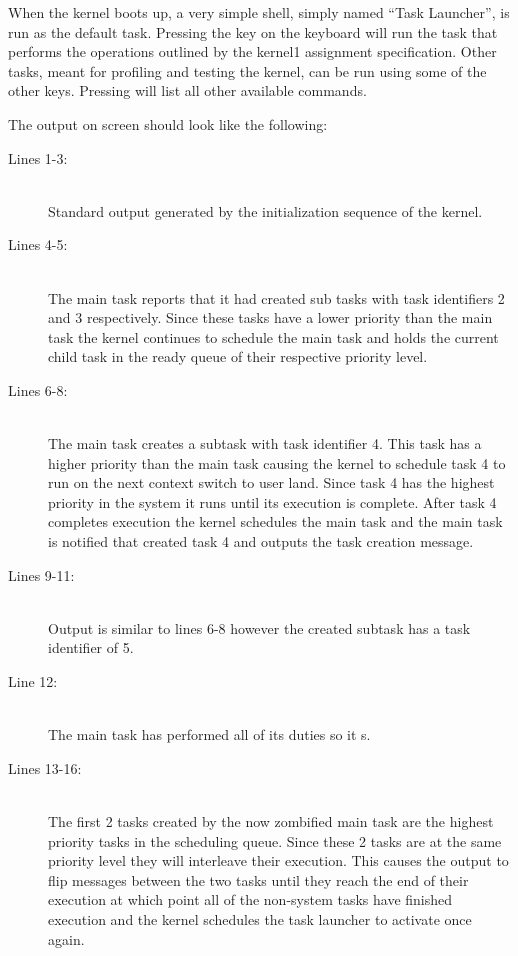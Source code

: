 \documentclass[pdftex,10pt,a4paper]{article}
\begin{document}
When the kernel boots up, a very simple shell, simply named ``Task
Launcher'', is run as the default task. Pressing the  key on
the keyboard will run the task that performs the operations outlined by
the kernel1 assignment specification. Other tasks, meant for
profiling and testing the kernel, can be run using some of the other
keys. Pressing  will list all other available commands.

The output on screen should look like the following:



\begin{description}
\item[Lines 1-3:] \hfill \\
  Standard output generated by the initialization sequence of the kernel.

\item[Lines 4-5:] \hfill \\
  The main task reports that it had created sub tasks with task
  identifiers 2 and 3 respectively. Since these tasks have a lower
  priority than the main task the kernel continues to schedule the main
  task and holds the current child task in the ready queue of their
  respective priority level.

\item[Lines 6-8:] \hfill \\
  The main task creates a subtask with task identifier 4. This task has
  a higher priority than the main task causing the kernel to schedule
  task 4 to run on the next context switch to user land. Since task 4
  has the highest priority in the system it runs until its execution
  is complete. After task 4 completes execution the kernel schedules
  the main task and the main task is notified that created task 4 and
  outputs the task creation message.

\item[Lines 9-11:] \hfill \\
  Output is similar to lines 6-8 however the created subtask has a task
  identifier of 5.

\item[Line 12:] \hfill \\
  The main task has performed all of its duties so it s.

\item[Lines 13-16:] \hfill \\
  The first 2 tasks created by the now zombified main task are the
  highest priority tasks in the scheduling queue. Since these 2 tasks
  are at the same priority level they will interleave their
  execution. This causes the output to flip messages between the two
  tasks until they reach the end of their execution at which point all
  of the non-system tasks have finished execution and the kernel
  schedules the task launcher to activate once again.

\end{description}
\end{document}
